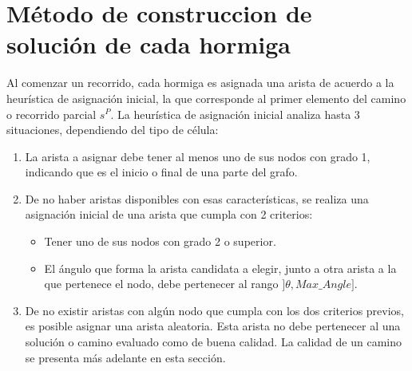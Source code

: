 \section{M\'etodo de construccion de soluci\'on de cada hormiga}
\label{subsubsec:antTourInit}
Al comenzar un recorrido, cada hormiga es asignada una arista de acuerdo a la heur\'istica de asignaci\'on inicial, la que corresponde al primer elemento del camino o recorrido parcial $s^{P}$. La heur\'istica de asignaci\'on inicial analiza hasta 3 situaciones, dependiendo del tipo de c\'elula:
\begin{enumerate}
\item La arista a asignar debe tener al menos uno de sus nodos con grado 1, indicando que es el inicio o final de una parte del grafo.

\item De no haber aristas disponibles con esas caracter\'isticas, se realiza una asignaci\'on inicial de una arista que cumpla con 2 criterios:
\begin{itemize}
    \item Tener uno de sus nodos con grado 2 o superior.
    \item El \'angulo que forma la arista candidata a elegir, junto a otra arista a la que pertenece el nodo, debe pertenecer al rango $]\theta, Max\_Angle]$.
\end{itemize}

\item De no existir aristas con alg\'un nodo que cumpla con los dos criterios previos, es posible asignar una arista aleatoria. Esta arista no debe pertenecer al una soluci\'on o camino evaluado como de buena calidad. La calidad de un camino se presenta m\'as adelante en esta secci\'on.
\end{enumerate}


